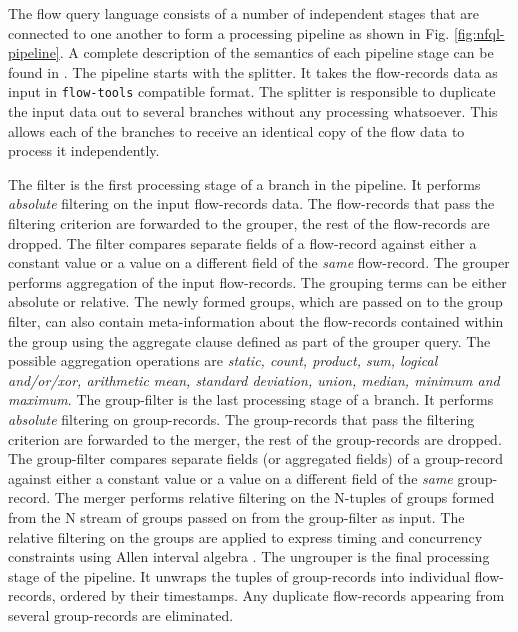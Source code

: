 The flow query language consists of a number of independent stages that are
connected to one another to form a processing pipeline as shown in Fig.
\ref{fig:nfql-pipeline}. A complete description of the semantics of each
pipeline stage can be found in \cite{vmarinov:2009}. The pipeline starts with
the splitter. It takes the flow-records data as input in \texttt{flow-tools}
compatible format. The splitter is responsible to duplicate the input data out
to several branches without any processing whatsoever. This allows each of the
branches to receive an identical copy of the flow data to process it
independently.

The filter is the first processing stage of a branch in the pipeline.  It
performs \emph{absolute} filtering on the input flow-records data.  The
flow-records that pass the filtering criterion are forwarded to the grouper,
the rest of the flow-records are dropped. The filter compares separate fields
of a flow-record against either a constant value or a value on a different
field of the \emph{same} flow-record. The grouper performs aggregation of the
input flow-records. The grouping terms can be either absolute or relative. The
newly formed groups, which are passed on to the group filter, can also contain
meta-information about the flow-records contained within the group using the
aggregate clause defined as part of the grouper query. The possible
aggregation operations are \emph{static, count, product, sum, logical
and/or/xor, arithmetic mean, standard deviation, union, median, minimum and
maximum}. The group-filter is the last processing stage of a branch. It
performs \emph{absolute} filtering on group-records. The group-records that
pass the filtering criterion are forwarded to the merger, the rest of the
group-records are dropped. The group-filter compares separate fields (or
aggregated fields) of a group-record against either a constant value or a
value on a different field of the \emph{same} group-record. The merger
performs relative filtering on the N-tuples of groups formed from the N stream
of groups passed on from the group-filter as input. The relative filtering on
the groups are applied to express timing and concurrency constraints using
Allen interval algebra \cite{fallen:1983}. The ungrouper is the final
processing stage of the pipeline. It unwraps the tuples of group-records into
individual flow-records, ordered by their timestamps. Any duplicate
flow-records appearing from several group-records are eliminated.
